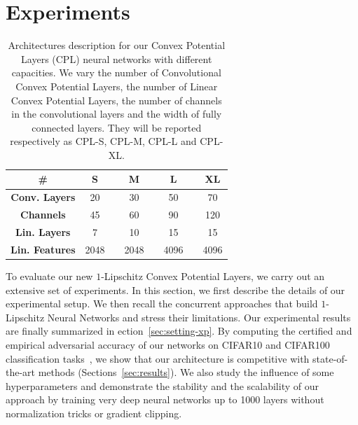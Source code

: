 \section{Experiments}
\label{section:experiments}
\begin{table}
\begin{center}
    \begin{tabular}{cccccccc}
    \toprule
    \textbf{\#} & \textbf{S} &  & \textbf{M} & & \textbf{L} & & \textbf{XL} \\
    \midrule
    \textbf{Conv. Layers}      & 20 & & 30 & & 50& & 70 \\
    \textbf{Channels}  &45 & & 60 & & 90 & & 120 \\ 
    \textbf{Lin. Layers}        &7 & & 10 & & 15 & & 15 \\
    \textbf{Lin. Features} & 2048 & & 2048 & & 4096 & & 4096 \\
    \bottomrule
    \end{tabular}%

\end{center}
\caption{\label{table:model-desc}
Architectures description for our Convex Potential Layers (CPL) neural networks with different capacities. We vary the number of Convolutional Convex Potential Layers, the number of Linear Convex Potential Layers, the number of channels in the convolutional layers and the width of fully
connected layers. They will be reported respectively as CPL-S, CPL-M, CPL-L and CPL-XL.}
\end{table}

To evaluate our new $1$-Lipschitz Convex Potential Layers, we carry out an extensive set of experiments. In this section, we first describe  the details of our experimental setup. We then recall  the concurrent approaches that build $1$-Lipschitz Neural Networks and stress their limitations. Our experimental results are finally summarized in ection~\ref{sec:setting-xp}. By computing the certified and empirical adversarial  accuracy of our networks on CIFAR10 and CIFAR100 classification tasks~\citep{krizhevsky2009learning}, we show that our architecture is competitive with state-of-the-art methods (Sections~\ref{sec:results}). We also study the influence of some hyperparameters and demonstrate the stability and the scalability of our approach by training very deep neural networks up to 1000 layers without normalization tricks or gradient clipping.










